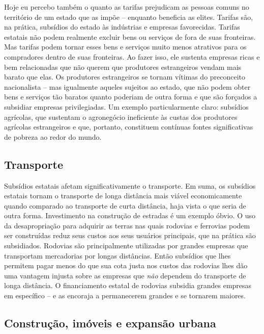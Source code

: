 Hoje eu percebo também o quanto as tarifas prejudicam as pessoas comuns no território de um estado que as impõe -- enquanto beneficia as elites. Tarifas são, na prática, subsídios do estado às indústrias e empresas favorecidas. Tarifas estatais não podem realmente excluir bens ou serviços de fora de suas fronteiras. Mas tarifas podem tornar esses bens e serviços muito menos atrativos para os compradores dentro de suas fronteiras. Ao fazer isso, ele sustenta empresas ricas e bem relacionadas que não querem que produtores estrangeiros vendam mais barato que elas. Os produtores estrangeiros se tornam vítimas do preconceito nacionalista -- mas igualmente aqueles sujeitos ao estado, que não podem obter bens e serviços tão baratos quanto poderiam de outra forma e que são forçados a subsidiar empresas privilegiadas. Um exemplo particularmente claro: subsídios agrícolas, que sustentam o agronegócio ineficiente às custas dos produtores agrícolas estrangeiros e que, portanto, constituem contínuas fontes significativas de pobreza ao redor do mundo.

\subsection*{Transporte}

Subsídios estatais afetam significativamente o transporte. Em suma, os subsídios estatais tornam o transporte de longa distância mais viável economicamente quando comparado ao transporte de curta distância, haja vista o que seria de outra forma. Investimento na construção de estradas é um exemplo óbvio. O uso da desapropriação para adquirir as terras nas quais rodovias e ferrovias podem ser construídas reduz seus custos aos seus usuários principais, que na prática são subsidiados. Rodovias são principalmente utilizadas por grandes empresas que transportam mercadorias por longas distâncias. Então subsídios que lhes permitem pagar menos do que sua cota justa nos custos das rodovias lhes dão uma vantagem injusta sobre as empresas que \emph{não} dependem do transporte de longa distância. O financiamento estatal de rodovias subsidia grandes empresas em específico -- e as encoraja a permanecerem grandes e se tornarem maiores.

\subsection*{Construção, imóveis e expansão urbana}

